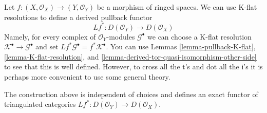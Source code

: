 \noindent
Let $f : (X, \mathcal{O}_X) \to (Y, \mathcal{O}_Y)$
be a morphism of ringed spaces. We can use K-flat resolutions to define
a derived pullback functor
$$
Lf^* : D(\mathcal{O}_Y) \to D(\mathcal{O}_X)
$$
Namely, for every complex of $\mathcal{O}_Y$-modules $\mathcal{G}^\bullet$
we can choose a K-flat resolution
$\mathcal{K}^\bullet \to \mathcal{G}^\bullet$ and set
$Lf^*\mathcal{G}^\bullet = f^*\mathcal{K}^\bullet$.
You can use
Lemmas \ref{lemma-pullback-K-flat},
\ref{lemma-K-flat-resolution}, and
\ref{lemma-derived-tor-quasi-isomorphism-other-side}
to see that this is well defined. However, to cross all the t's and dot all
the i's it is perhaps more convenient to use some general theory.

\begin{lemma}
\label{lemma-derived-base-change}
The construction above is independent of choices and defines an exact
functor of triangulated categories
$Lf^* : D(\mathcal{O}_Y) \to D(\mathcal{O}_X)$.
\end{lemma}

